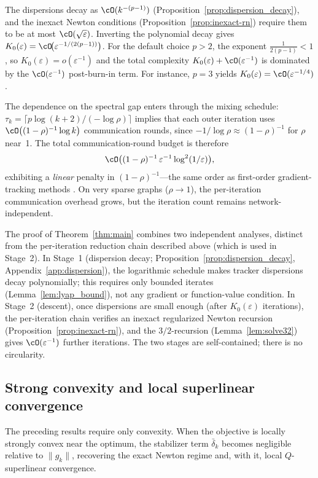 \documentclass[review,onefignum,onetabnum]{siamart171218}
\begin{document}
\begin{remark}\label{rem:burnin_order}
The dispersions decay as $\cO(k^{-(p-1)})$
(Proposition~\ref{prop:dispersion_decay}), and the inexact Newton
conditions (Proposition~\ref{prop:inexact-rn}) require them to be at
most $\cO(\sqrt\varepsilon)$.
Inverting the polynomial decay gives
$K_0(\varepsilon)=\cO\!\bigl(\varepsilon^{-1/(2(p-1))}\bigr)$.
For the default choice $p>2$, the exponent $\frac{1}{2(p-1)}<1$, so
$K_0(\varepsilon)=o(\varepsilon^{-1})$ and the total complexity
$K_0(\varepsilon)+\cO(\varepsilon^{-1})$ is dominated by the
$\cO(\varepsilon^{-1})$ post-burn-in term.
For instance, $p=3$ yields
$K_0(\varepsilon)=\cO(\varepsilon^{-1/4})$.

The dependence on the spectral gap enters through the mixing schedule:
$\tau_k=\lceil p\log(k+2)/(-\log\rho)\rceil$ implies that each
outer iteration uses $\cO\bigl((1-\rho)^{-1}\log k\bigr)$
communication rounds, since $-1/\log\rho\approx(1-\rho)^{-1}$ for
$\rho$ near~1.
The total communication-round budget is therefore
\[
\cO\bigl((1-\rho)^{-1}\,\varepsilon^{-1}\log^2(1/\varepsilon)\bigr),
\]
exhibiting a \emph{linear} penalty in $(1-\rho)^{-1}$---the same
order as first-order gradient-tracking methods
\citep{nedic2017diging}.
On very sparse graphs ($\rho\to 1$), the per-iteration communication
overhead grows, but the iteration count remains network-independent.
\end{remark}

\begin{remark}\label{rem:two_stages}
The proof of Theorem~\ref{thm:main} combines two independent
analyses, distinct from the per-iteration reduction chain described above
(which is used in Stage~2).
In Stage~1 (dispersion decay;
Proposition~\ref{prop:dispersion_decay},
Appendix~\ref{app:dispersion}), the logarithmic schedule
makes tracker dispersions decay polynomially; this requires only
bounded iterates (Lemma~\ref{lem:lyap_bound}), not any gradient
or function-value condition.
In Stage~2 (descent), once dispersions are small enough
(after $K_0(\varepsilon)$ iterations), the per-iteration chain
verifies an inexact regularized Newton recursion
(Proposition~\ref{prop:inexact-rn}), and the $3/2$-recursion
(Lemma~\ref{lem:solve32}) gives $\cO(\varepsilon^{-1})$ further
iterations.
The two stages are self-contained; there is no circularity.
\end{remark}

\subsection{Strong convexity and local superlinear convergence}\label{ssec:superlinear}
The preceding results require only convexity.
When the objective is locally strongly convex near the optimum,
the stabilizer term $\bar\delta_k$ becomes negligible relative to
$\|g_k\|$, recovering the exact Newton regime and, with it, local
$Q$-superlinear convergence.
\end{document}
